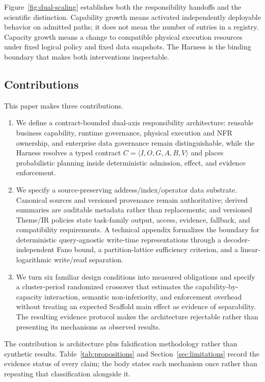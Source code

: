 \documentclass[11pt]{article}
\begin{document}
Figure~\ref{fig:dual-scaling} establishes both the responsibility handoffs and the scientific distinction. Capability growth means activated independently deployable behavior on admitted paths; it does not mean the number of entries in a registry. Capacity growth means a change to compatible physical execution resources under fixed logical policy and fixed data snapshots. The Harness is the binding boundary that makes both interventions inspectable.

\subsection{Contributions}

This paper makes three contributions.

\begin{enumerate}
\item We define a contract-bounded dual-axis responsibility architecture: reusable business capability, runtime governance, physical execution and NFR ownership, and enterprise data governance remain distinguishable, while the Harness resolves a typed contract $C=\langle I,O,G,A,B,V\rangle$ and places probabilistic planning inside deterministic admission, effect, and evidence enforcement.
\item We specify a source-preserving address/index/operator data substrate. Canonical sources and versioned provenance remain authoritative; derived summaries are auditable metadata rather than replacements; and versioned Theme/IR policies state task-family output, access, evidence, fallback, and compatibility requirements. A technical appendix formalizes the boundary for deterministic query-agnostic write-time representations through a decoder-independent Fano bound, a partition-lattice sufficiency criterion, and a linear-logarithmic write/read separation.
\item We turn six familiar design conditions into measured obligations and specify a cluster-period randomized crossover that estimates the capability-by-capacity interaction, semantic non-inferiority, and enforcement overhead without treating an expected Scaffold main effect as evidence of separability. The resulting evidence protocol makes the architecture rejectable rather than presenting its mechanisms as observed results.
\end{enumerate}

The contribution is architecture plus falsification methodology rather than synthetic results. Table~\ref{tab:propositions} and Section~\ref{sec:limitations} record the evidence status of every claim; the body states each mechanism once rather than repeating that classification alongside it.
\end{document}
